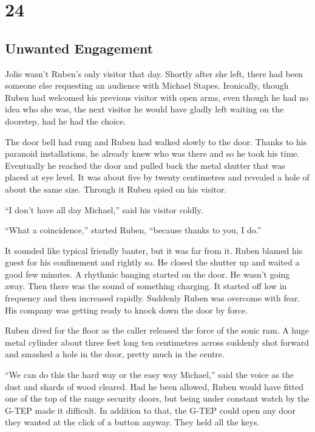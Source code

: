 \chapter{24}
\section{Unwanted Engagement}


Jolie wasn't Ruben's only visitor that day.  Shortly after she left, there had been someone else requesting an audience with Michael Stapes.  Ironically, though Ruben had welcomed his previous visitor with open arms, even though he had no idea who she was, the next visitor he would have gladly left waiting on the doorstep, had he had the choice.

The door bell had rung and Ruben had walked slowly to the door.  Thanks to his paranoid installations, he already knew who was there and so he took his time.  Eventually he reached the door and pulled back the metal shutter that was placed at eye level.  It was about five by twenty centimetres and revealed a hole of about the same size.  Through it Ruben spied on his visitor.  

``I don't have all day Michael,'' said his visitor coldly.

``What a coincidence,'' started Ruben, ``because thanks to you, I do.''  

It sounded like typical friendly banter, but it was far from it.  Ruben blamed his guest for his confinement and rightly so.  He closed the shutter up and waited a good few minutes.  A rhythmic banging started on the door.  He wasn't going away.  Then there was the sound of something charging.  It started off low in frequency and then increased rapidly.  Suddenly Ruben was overcome with fear.  His company was getting ready to knock down the door by force.  

Ruben dived for the floor as the caller released the force of the sonic ram.  A huge metal cylinder about three feet long ten centimetres across suddenly shot forward and smashed a hole in the door, pretty much in the centre.

``We can do this the hard way or the easy way Michael,'' said the voice as the dust and shards of wood cleared.  Had he been allowed, Ruben would have fitted one of the top of the range security doors, but being under constant watch by the G-TEP made it difficult.  In addition to that, the G-TEP could open any door they wanted at the click of a button anyway.  They held all the keys.

